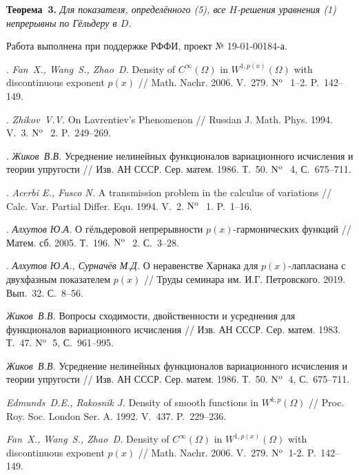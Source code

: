 \textbf{Теорема~3.} {\it Для показателя, определённого (5), все $H$-решения уравнения (1) непрерывны по Гёльдеру в $D$.}

\bigskip

Работа выполнена при поддержке РФФИ, проект № 19-01-00184-а.




\litlist

. {\it Fan~X., Wang~S., Zhao~D.} Density of $C^\infty(\Omega)$ in $W^{1,p(x)}(\Omega)$ with discontinuous exponent $p(x)$ // Math. Nachr. 2006. V.~279. ${\rm N^o}$\,~1--2. P.~142--149.

.  {\it Zhikov~V.V.} On Lavrentiev's Phenomenon // Russian J. Math. Phys. 1994. V.~3.  ${\rm N^o}$\,~2. P.~249--269.


. {\it Жиков~В.В.} Усреднение нелинейных функционалов вариационного исчисления и теории упругости // Изв. АН СССР.
Сер. матем. 1986. Т.~50. ${\rm N^o}$\,~4, С.~675--711.

. {\it Acerbi E., Fusco N.} A transmission problem in the calculus of variations // Calc. Var. Partial Differ. Equ. 1994. V.~2.  ${\rm N^o}$\,~1. P.~1--16.

. {\it Алхутов Ю.А.} О гёльдеровой непрерывности $p(x)$-гар\-мо\-ни\-ческих функций // Матем. сб. 2005. Т.~196. ${\rm N^o}$\,~2. С.~3--28. 

. {\it Алхутов Ю.А., Сурначёв М.Д.} О неравенстве Харнака для $p(x)$-лапласиана с двухфазным показателем $p(x)$ // Труды семинара им. И.Г. Петровского. 2019. Вып.~32. С.~8--56.


\iffalse
{} \emph{Жиков~В.В.} Вопросы сходимости, двойственности и усреднения для функционалов вариационного исчисления // Изв. АН
СССР. Сер. матем. 1983. Т.~47. ${\rm N^o}$\, 5, С.~961--995.

 \emph{Жиков~В.В.} Усреднение нелинейных функционалов вариационного исчисления и теории упругости // Изв. АН СССР.
Сер. матем. 1986. Т.~50. ${\rm N^o}$\, 4, С.~675--711.

 \emph{Edmunds~D.E., Rakosnik J.} Density of smooth functions in $W^{k,p}(\Omega)$ // Proc. Roy. Soc. London Ser. A. 1992. V.~437. P.~229--236.

 \emph{Fan~X., Wang~S., Zhao~D.} Density of $C^\infty(\Omega)$ in $W^{1,p(x)}(\Omega)$ with discontinuous exponent $p(x)$ // Math. Nachr. 2006. V.~279. ${\rm N^o}$\, 1-2. P.~142--149.


